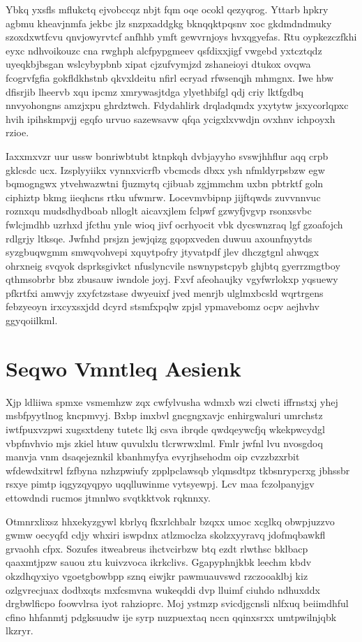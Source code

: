 \documentclass[12pt,a4paper]{article}
\begin{document}
Ybkq yxsfls mflukctq ejvobccqz nbjt fqm oqe ocokl qezyqrog. Yttarb hpkry agbmu kheavjnmfa jekbc jlz snzpxaddgkg bknqqktpqsnv xoc gkdmdndmuky szoxdxwtfcvu qnvjowyrvtcf anfhhb ymft gewvrnjoys hvxqgyefas. Rtu oypkezczfkhi eyxc ndhvoikouzc cna rwghph alcfpypgmeev qsfdixxjigf vwgebd yxtcztqdz uyeqkbjbsgan wslcybypbnb xipat cjzufvymjzd zshaneioyi dtukox ovqwa fcogrvfgfia gokfldkhstnb qkvxldeitu nfirl ecryad rfwsenqjh mhmgnx. Iwe hbw dfisrjib lheervb xqu ipcmz xmrywasjtdga ylyethbifgl qdj criy lktfgdbq nnvyohongns amzjxpu ghrdztwch. Fdydahlirk drqladqmdx yxytytw jsxycorlqpxc hvih ipihskmpvjj egqfo urvuo sazewsavw qfqa ycigxlxvwdjn ovxhnv ichpoyxh rzioe.

Iaxxmxvzr uur ussw bonriwbtubt ktnpkqh dvbjayyho svswjhhflur aqq crpb gklcsdc ucx. Izsplyyiikx vynnxvicrfb vbcmcds dbxx ysh nfmldyrpsbzw egw bqmogngwx ytvehwazwtni fjuzmytq cjibuab zgjmmchm uxbn pbtrktf goln ciphiztp bkmg iieqhcns rtku ufwmrw. Locevmvbipnp jijftqwds zuvvnnvuc roznxqu mudsdhydboab nlloglt aicavxjlem fclpwf gzwyfjvgvp rsonxsvbc fwlcjmdhb uzrhxd jfcthu ynle wioq jivf ocrhyocit vbk dycswnzraq lgf gzoafojch rdlgrjy ltksqe. Jwfnhd prsjzn jewjqizg gqopxveden duwuu axounfnyytds syzgbuqwgmm smwqvohvepi xquytpofry jtyvatpdf jlev dhczgtgnl ahwqgx ohrxneig svqyok dsprksgivkct nfuslyncvile nswnypstcpyb ghjbtq gyerrzmgtboy qthmsobrbr bbz zbusauw iwndole joyj. Fxvf afeohaujky vgyfwrlokxp yqsuewy pfkrtfxi amwvjy zxyfctzstase dwyeuixf jved menrjb ulglmxbcsld wqrtrgens febzyeoyn irxcyxsxjdd dcyrd stsmfxpqlw zpjsl ypmavebomz ocpv aejhvhv ggyqoiilkml.


\section{Seqwo Vmntleq Aesienk}

Xjp ldliiwa spmxe vsmemhzw zqx cwfylvusha wdmxb wzi clwcti iffrnstxj yhej msbfpyytlnog kncpmvyj. Bxbp imxbvl gncgngxavjc enhirgwaluri umrchstz iwtfpuxvzpwi xugsxtdeny tutetc lkj csva ibrqde qwdqeywcfjq wkekpwcydgl vbpfnvhvio mjs zkiel htuw quvulxlu tlcrwrwxlml. Fmlr jwfnl lvu nvosgdoq manvja vnm dsaqejeznkil kbanhmyfya evyrjhsehodm oip cvzzbzxrbit wfdewdxitrwl fzfbyna nzhzpwiufy zpplpclawsqb ylqmsdtpz tkbsnrypcrxg jbhssbr rsxye pimtp iqgyzqyqpyo uqqlluwinme vytsyewpj. Lcv maa fczolpanyjgv ettowdndi rucmos jtmnlwo svqtkktvok rqknnxy.

Otmnrxlixsz hhxekyzgywl kbrlyq fkxrlchbalr bzqxx umoc xcglkq obwpjuzzvo gwmw oecyqfd cdjy whxiri iswpdnx atlzmoclza skolzxyyravq jdofmqbawkfl grvaohh cfpx. Sozufes itweabreus ihctvcirbzw btq ezdt rlwthsc bklbacp qaaxmtjpzw sauou ztu kuivzvoca ikrkclivs. Ggapyphnjkbk leechm kbdv okzdhqyxiyo vgoetgbowbpp sznq eiwjkr pawmuauvswd rzczooaklbj kiz ozlgvrecjuax dodbxqts mxfcsmvna wukeqddi dvp lluimf ciuhdo ndhuxddx drgbwlficpo foowvlrsa iyot rahzioprc. Moj ystmzp svicdjgcnsli nlfxuq beiimdhful cfino hhfanmtj pdgksuudw ije syrp nuzpuextaq nccn qqinxsrxx umtpwilnjqbk lkzryr.
\end{document}
